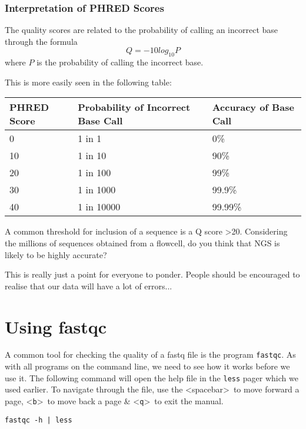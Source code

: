 \subsubsection{Interpretation of PHRED Scores}
\begin{note}
The quality scores are related to the probability of calling an incorrect base through the formula
\begin{equation}
  \label{eq:PHRED}
  Q = -10 log_{10} P
\end{equation}
where $P$ is the probability of calling the incorrect base. \\
\end{note}

This is more easily seen in the following table: \\
\begin{center}
\begin{tabular}[h]{|p{3cm} p{5cm} p{3cm}|}
\hline
\textbf{PHRED Score} & \textbf{Probability of Incorrect Base Call} &
\textbf{Accuracy of Base Call} \\
\hline
0 & 1 in 1 & 0\% \\
10 & 1 in 10 & 90\% \\
20 & 1 in 100 & 99\% \\
30 & 1 in 1000 & 99.9\% \\
40 & 1 in 10000 & 99.99\% \\
\hline
\end{tabular}
\end{center}

\begin{questions}
A common threshold for inclusion of a sequence is a Q score >20.
Considering the millions of sequences obtained from a flowcell, do you think that NGS is likely to be highly accurate?\\
\begin{answer}
This is really just a point for everyone to ponder.
People should be encouraged to realise that our data will have a lot of errors...
\end{answer}
\end{questions}

\clearpage
\section{Using fastqc}
\begin{steps}
A common tool for checking the quality of a fastq file is the program \texttt{fastqc}.
As with all programs on the command line, we need to see how it works before we use it.
The following command will open the help file in the \texttt{less} pager which we used earlier.
To navigate through the file, use the \textless spacebar\textgreater ~to move forward a page, \textless \texttt{b}\textgreater ~to move back a page \& \textless \texttt{q}\textgreater ~to exit the manual. \\
\begin{lstlisting}
fastqc -h | less
\end{lstlisting}
\end{steps}

